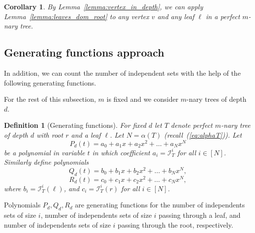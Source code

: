 \documentclass{amsart}
\newtheorem{definition}[theorem]{Definition}
\newtheorem{corollary}[theorem]{Corollary}
\theoremstyle{definition}
\newcommand\II{{\mathcal I}}
\begin{document}
\begin{corollary}
	By Lemma~\ref{lemma:vertex_in_depth}, we can apply Lemma~\ref{lemma:leaves_dom_root} to any vertex $v$ and any leaf $\ell$ in a perfect $m$-nary tree.
\end{corollary}

\newpage
\subsection{Generating functions approach}

In addition, we can count the number of independent sets with the help of the following generating functions.

For the rest of this subsection, $m$ is fixed and we consider $m$-nary trees of depth $d$.

\begin{definition}[Generating functions]
	For fixed $d$ let $T$ denote perfect $m$-nary tree of depth $d$ with root $r$ and a leaf $\ell$. Let $N=\alpha(T)$ (recall~(\ref{eq:alphaT})). Let $$P_{d}(t)=a_0+a_1x+a_2x^2+\ldots +a_N x^{N}$$ be a polynomial in variable $t$ in which coefficient $a_i=\II^{i}_{T}$ for all $i\in [N]$.
	Similarly define polynomials
	$$Q_d(t)=b_0+b_1x+b_2x^2+\ldots +b_N x^{N},$$
	$$R_d(t)=c_0+c_1x+c_2x^2+\ldots +c_N x^{N},$$
	where $b_i=\II^{i}_{T}(\ell)$, and $c_i=\II^{i}_T(r)$ for all $i\in[N]$.
\end{definition}
Polynomials $P_d, Q_d, R_d$ are generating functions for the number of independents sets of size $i$, number of independents sets of size $i$ passing through a leaf, and number of independents sets of size $i$ passing through the root, respectively.
\end{document}
